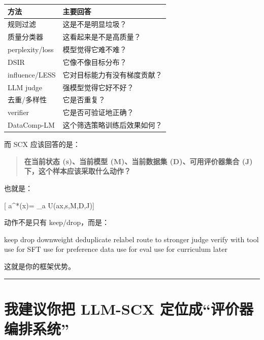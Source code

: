 \documentclass[
  12pt,
]{ctexart}
\newenvironment{Shaded}{}{}
\newcommand{\NormalTok}[1]{#1}
\begin{document}
\begin{longtable}[]{@{}ll@{}}
\toprule\noalign{}
方法 & 主要回答 \\
\midrule\noalign{}
\endhead
\bottomrule\noalign{}
\endlastfoot
规则过滤 & 这是不是明显垃圾？ \\
质量分类器 & 这看起来是不是高质量？ \\
perplexity/loss & 模型觉得它难不难？ \\
DSIR & 它像不像目标分布？ \\
influence/LESS & 它对目标能力有没有梯度贡献？ \\
LLM judge & 强模型觉得它好不好？ \\
去重/多样性 & 它是否重复？ \\
verifier & 它是否可验证地正确？ \\
DataComp-LM & 这个筛选策略训练后效果如何？ \\
\end{longtable}

而 SCX 应该回答的是：

\begin{quote}
\textbf{在当前状态 (s)、当前模型 (\mathcal M)、当前数据集
(\mathcal D)、可用评价器集合 (\mathcal J)
下，这个样本应该采取什么动作？}
\end{quote}

也就是：

{[} a\^{}*(x)= \arg\max\_a
U(a\mid x,s,\mathcal M,\mathcal D,\mathcal J){]}

动作不是只有 keep/drop，而是：

\begin{Shaded}
\begin{Highlighting}[]
\NormalTok{keep}
\NormalTok{drop}
\NormalTok{downweight}
\NormalTok{deduplicate}
\NormalTok{relabel}
\NormalTok{route to stronger judge}
\NormalTok{verify with tool}
\NormalTok{use for SFT}
\NormalTok{use for preference data}
\NormalTok{use for eval}
\NormalTok{use for curriculum later}
\end{Highlighting}
\end{Shaded}

这就是你的框架优势。

\begin{center}\rule{0.5\linewidth}{0.5pt}\end{center}

\section{我建议你把 LLM-SCX
定位成``评价器编排系统''}\label{ux6211ux5efaux8baeux4f60ux628a-llm-scx-ux5b9aux4f4dux6210ux8bc4ux4ef7ux5668ux7f16ux6392ux7cfbux7edf}
\end{document}
